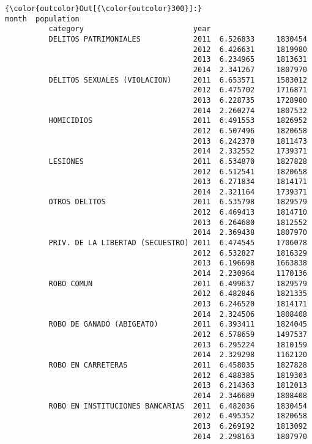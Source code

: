 \documentclass[11pt]{article}
\begin{document}
\begin{Verbatim}[commandchars=\\\{\}]
{\color{outcolor}Out[{\color{outcolor}300}]:}                                           month  population
          category                         year                      
          DELITOS PATRIMONIALES            2011  6.526833     1830454
                                           2012  6.426631     1819980
                                           2013  6.234965     1813631
                                           2014  2.341267     1807970
          DELITOS SEXUALES (VIOLACION)     2011  6.653571     1583012
                                           2012  6.475702     1716871
                                           2013  6.228735     1728980
                                           2014  2.260274     1807532
          HOMICIDIOS                       2011  6.491553     1826952
                                           2012  6.507496     1820658
                                           2013  6.242370     1811473
                                           2014  2.332552     1739371
          LESIONES                         2011  6.534870     1827828
                                           2012  6.512541     1820658
                                           2013  6.271834     1814171
                                           2014  2.321164     1739371
          OTROS DELITOS                    2011  6.535798     1829579
                                           2012  6.469413     1814710
                                           2013  6.264680     1812552
                                           2014  2.369438     1807970
          PRIV. DE LA LIBERTAD (SECUESTRO) 2011  6.474545     1706078
                                           2012  6.532827     1816329
                                           2013  6.196698     1663838
                                           2014  2.230964     1170136
          ROBO COMUN                       2011  6.499637     1829579
                                           2012  6.482846     1821335
                                           2013  6.246520     1814171
                                           2014  2.324506     1808408
          ROBO DE GANADO (ABIGEATO)        2011  6.393411     1824045
                                           2012  6.578659     1497537
                                           2013  6.295224     1810159
                                           2014  2.329298     1162120
          ROBO EN CARRETERAS               2011  6.458035     1827828
                                           2012  6.488385     1819303
                                           2013  6.214363     1812013
                                           2014  2.346689     1808408
          ROBO EN INSTITUCIONES BANCARIAS  2011  6.482036     1830454
                                           2012  6.495352     1820658
                                           2013  6.269192     1813092
                                           2014  2.298163     1807970
\end{Verbatim}
            
\end{document}
